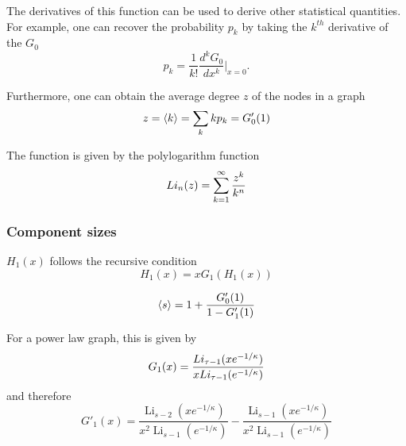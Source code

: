 The derivatives of this function can be used to derive other statistical quantities.
For example, one can recover the probability $p_k$ by taking the $k^{th}$ derivative of the $G_0$
\begin{equation}
	p_k = \frac{1}{k!} \frac{d^k G_0}{dx^k} \Big|_{x=0}.
\end{equation}

Furthermore, one can obtain the average degree $z$ of the nodes in a graph 
\begin{equation}
	z = \left< k \right> = \sum_k k p_k = G'_0(1)
\end{equation}

The function is given by the polylogarithm function
\begin{equation}
	Li_{n} ({z}) = \sum_{k=1}^{\infty} \frac{z^k}{k^n}
\end{equation}

\subsubsection{Component sizes} %
\label{ssub:component_sizes}

$H_1(x)$ follows the recursive condition
\begin{equation}
	H_1(x) = x G_1( H_1(x))
\end{equation}


\begin{equation}
\left< s \right> = 1 + \frac{G'_0(1)}{1-G'_1(1)}	
\end{equation}


For a power law graph, this is given by
\begin{equation}
	G_1(x) = \frac{Li_{\tau-1} ({xe^{-1/\kappa}})}{xLi_{\tau-1} ({e^{-1/\kappa}})}
\end{equation}
and therefore
\begin{equation}
	G'_1(x) = \frac{\operatorname{Li}_{s - 2} \left(x e^{- 1/\kappa}\right)}
	               {x^{2} \operatorname{Li}_{s - 1}\left(e^{- 1/\kappa}\right)} -
	          \frac{\operatorname{Li}_{s - 1}\left(x e^{- 1/\kappa}\right)}
	               {x^{2} \operatorname{Li}_{s - 1}\left(e^{- 1/\kappa}\right)}
\end{equation}

